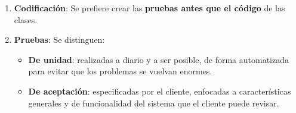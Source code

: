 \begin{enumerate}
   \item \textbf{Codificación}: Se prefiere crear las \textbf{pruebas antes que el código} de las clases.
   
   \item \textbf{Pruebas}: Se distinguen:
   \begin{itemize}
      \item \textbf{De unidad}: realizadas a diario y a ser posible, de forma automatizada para evitar que los problemas se vuelvan enormes.
      \item \textbf{De aceptación}: especificadas por el cliente, enfocadas a características generales y de funcionalidad del sistema que el cliente puede revisar. %
   \end{itemize}
\end{enumerate}